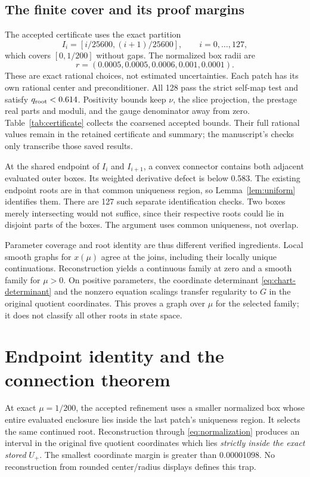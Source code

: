 \documentclass[11pt,a4paper]{article}
\numberwithin{equation}{section}
\begin{document}
\subsection{The finite cover and its proof margins}\label{sec:cover}
The accepted certificate uses the exact partition
\begin{equation}
I_i=[i/25600,(i+1)/25600],\qquad i=0,\ldots,127,\label{eq:partition}
\end{equation}
which covers $[0,1/200]$ without gaps. The normalized box radii are
\begin{equation}
r=(0.0005,0.0005,0.0006,0.001,0.0001).\label{eq:radii}
\end{equation}
These are exact rational choices, not estimated uncertainties. Each patch has its own rational center and preconditioner. All 128 pass the strict self-map test and satisfy $q_{\rm root}<0.614$. Positivity bounds keep $\nu$, the slice projection, the prestage real parts and moduli, and the gauge denominator away from zero. Table~\ref{tab:certificate} collects the coarsened accepted bounds. Their full rational values remain in the retained certificate and summary; the manuscript's checks only transcribe those saved results.



At the shared endpoint of $I_i$ and $I_{i+1}$, a convex connector contains both adjacent evaluated outer boxes. Its weighted derivative defect is below 0.583. The existing endpoint roots are in that common uniqueness region, so Lemma~\ref{lem:uniform} identifies them. There are 127 such separate identification checks. Two boxes merely intersecting would not suffice, since their respective roots could lie in disjoint parts of the boxes. The argument uses common uniqueness, not overlap.

Parameter coverage and root identity are thus different verified ingredients. Local smooth graphs for $x(\mu)$ agree at the joins, including their locally unique continuations. Reconstruction yields a continuous family at zero and a smooth family for $\mu>0$. On positive parameters, the coordinate determinant \eqref{eq:chart-determinant} and the nonzero equation scalings transfer regularity to $G$ in the original quotient coordinates. This proves a graph over $\mu$ for the selected family; it does not classify all other roots in state space.

\section{Endpoint identity and the connection theorem}\label{sec:endpoint}
At exact $\mu=1/200$, the accepted refinement uses a smaller normalized box whose entire evaluated enclosure lies inside the last patch's uniqueness region. It selects the same continued root. Reconstruction through \eqref{eq:normalization} produces an interval in the original five quotient coordinates which lies \emph{strictly inside the exact stored} $U_+$. The smallest coordinate margin is greater than $0.00001098$. No reconstruction from rounded center/radius displays defines this trap.
\end{document}
